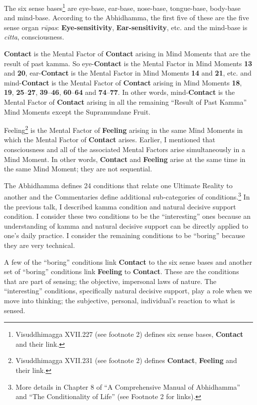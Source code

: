 The six sense bases\footnote{Visuddhimagga XVII.227 (see footnote 2) defines six sense bases, \textbf{Contact} and their link.} are eye-base, ear-base, nose-base, tongue-base, body-base and mind-base. According to the Abhidhamma, the first five of these are the five sense organ \textit{rūpas}: \textbf{Eye-sensitivity}, \textbf{Ear-sensitivity}, etc. and the mind-base is \textit{citta}, consciousness.

\textbf{Contact} is the Mental Factor of \textbf{Contact} arising in Mind Moments that are the result of past kamma. So eye-\textbf{Contact} is the Mental Factor in Mind Moments \textbf{13} and \textbf{20}, ear-\textbf{Contact} is the Mental Factor in Mind Moments \textbf{14} and \textbf{21}, etc. and mind-\textbf{Contact} is the Mental Factor of \textbf{Contact} arising in Mind Moments \textbf{18}, \textbf{19}, \textbf{25}--\textbf{27}, \textbf{39}--\textbf{46}, \textbf{60}--\textbf{64} and \textbf{74}--\textbf{77}. In other words, mind-\textbf{Contact} is the Mental Factor of \textbf{Contact} arising in all the remaining “Result of Past Kamma” Mind Moments except the Supramundane Fruit.

Feeling\footnote{Visuddhimagga XVII.231 (see footnote 2) defines \textbf{Contact}, \textbf{Feeling} and their link.} is the Mental Factor of \textbf{Feeling} arising in the same Mind Moments in which the Mental Factor of \textbf{Contact} arises. Earlier, I mentioned that consciousness and all of the associated Mental Factors arise simultaneously in a Mind Moment. In other words, \textbf{Contact} and \textbf{Feeling} arise at the same time in the same Mind Moment; they are not sequential.

The Abhidhamma defines 24 conditions that relate one Ultimate Reality to another and the Commentaries define additional sub-categories of conditions.\footnote{More details in Chapter 8 of “A Comprehensive Manual of Abhidhamma” and “The Conditionality of Life” (see Footnote 2 for links).} In the previous talk, I described kamma condition and natural decisive support condition. I consider these two conditions to be the “interesting” ones because an understanding of kamma and natural decisive support can be directly applied to one’s daily \color{blue} practice\color{black}. I consider the remaining conditions to be “boring” because they are very technical.

A few of the “boring” conditions link \textbf{Contact} to the six sense bases and another set of “boring” conditions link \textbf{Feeling} to \textbf{Contact}. These are the conditions that are part of sensing; the objective, impersonal laws of nature. The “interesting” conditions, specifically natural decisive support, play a role when we move into thinking; the subjective, personal, individual’s reaction to what is sensed.

